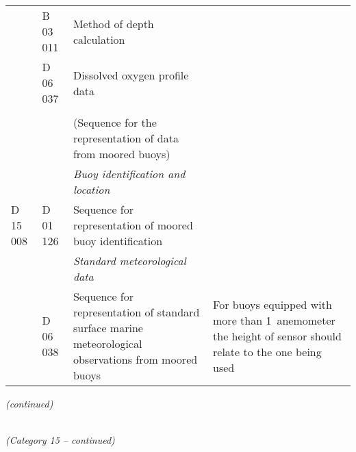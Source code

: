 \begin{longtable}[]{@{}llll@{}}
& B 03 011 & Method of depth calculation &\tabularnewline
& D 06 037 & Dissolved oxygen profile data &\tabularnewline
& & &\tabularnewline
& & (Sequence for the representation of data from moored buoys) &\tabularnewline
& & \emph{Buoy identification and location} &\tabularnewline
D 15 008 & D 01 126 & Sequence for representation of moored buoy identification &\tabularnewline
& & \emph{Standard meteorological data} &\tabularnewline
& D 06 038 & Sequence for representation of standard surface marine meteorological observations from moored buoys & For buoys equipped with more than 1~anemometer the height of sensor should relate to the one being used\tabularnewline
\bottomrule
\end{longtable}

\emph{(continued)}

\emph{\\
(Category 15 -- continued)}

